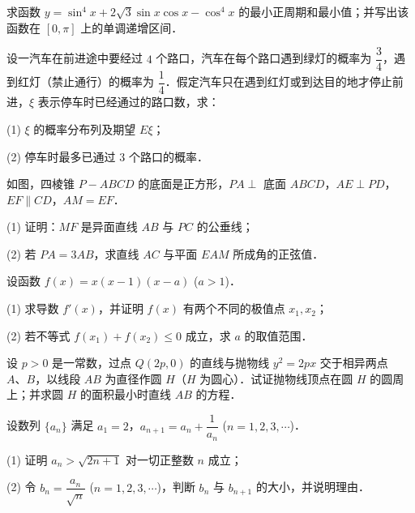 \begin{question}
求函数 $y = \sin^4 x + 2\sqrt{3} \sin x \cos x - \cos^4 x$ 的最小正周期和最小值；并写出该函数在 $[0, \pi]$ 上的单调递增区间．

\end{question}
\begin{question}
设一汽车在前进途中要经过 $4$ 个路口，汽车在每个路口遇到绿灯的概率为 $\dfrac{3}{4}$，遇到红灯（禁止通行）的概率为 $\dfrac{1}{4}$．假定汽车只在遇到红灯或到达目的地才停止前进，$\xi$ 表示停车时已经通过的路口数，求：

(1) $\xi$ 的概率分布列及期望 $E\xi$；

(2) 停车时最多已通过 $3$ 个路口的概率．

\Needspace{0.4\textheight}
\end{question}
\begin{question}
如图，四棱锥 $P - ABCD$ 的底面是正方形，$PA \perp$ 底面 $ABCD$，$AE \perp PD$，$EF \parallel CD$，$AM = EF$．
\nopagebreak[4]
\begin{center}\end{center}
\nopagebreak[4]
(1) 证明：$MF$ 是异面直线 $AB$ 与 $PC$ 的公垂线；

(2) 若 $PA = 3AB$，求直线 $AC$ 与平面 $EAM$ 所成角的正弦值．

\end{question}
\begin{question}
设函数 $f(x) = x(x - 1)(x - a)$ ($a > 1$)．

(1) 求导数 $f'(x)$，并证明 $f(x)$ 有两个不同的极值点 $x_1, x_2$；

(2) 若不等式 $f(x_1) + f(x_2) \leqslant 0$ 成立，求 $a$ 的取值范围．

\end{question}
\begin{question}
设 $p > 0$ 是一常数，过点 $Q(2p, 0)$ 的直线与抛物线 $y^2 = 2px$ 交于相异两点 $A\text{、}B$，以线段 $AB$ 为直径作圆 $H$（$H$ 为圆心）．试证抛物线顶点在圆 $H$ 的圆周上；并求圆 $H$ 的面积最小时直线 $AB$ 的方程．

\end{question}
\begin{question}
设数列 $\{a_n\}$ 满足 $a_1 = 2$，$a_{n+1} = a_n + \dfrac{1}{a_n}$ ($n = 1, 2, 3, \cdots$)．

(1) 证明 $a_n > \sqrt{2n + 1}$ 对一切正整数 $n$ 成立；

(2) 令 $b_n = \dfrac{a_n}{\sqrt{n}}$ ($n = 1, 2, 3, \cdots$)，判断 $b_n$ 与 $b_{n+1}$ 的大小，并说明理由．

\end{question}